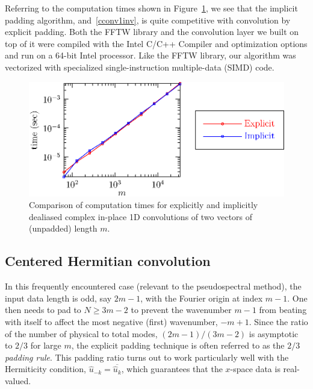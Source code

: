 \documentclass[final]{siamltex}
\begin{document}
Referring to the computation times shown in Figure~\ref{timing1c},
we see that the implicit padding algorithm,  and~\ref{cconv1inv},
is quite competitive with convolution by explicit padding. Both the FFTW library
and the convolution layer we built on top of it were compiled with the
Intel C/C++ Compiler and optimization options and run on a 64-bit Intel
processor. Like the FFTW library, our algorithm was vectorized with specialized
single-instruction multiple-data (SIMD) code.

\begin{figure}[htbp]
  \begin{center}
    \includegraphics{timing1c}
    \caption{Comparison of computation times for explicitly and implicitly
dealiased complex in-place 1D convolutions of two vectors of
(unpadded) length $m$.}
    \label{timing1c}
  \end{center}
\end{figure}

\subsection{Centered Hermitian convolution}

In this frequently encountered case (relevant to the pseudospectral
method), the input data length is odd, say $2m-1$, with the Fourier origin
at index $m-1$. One then needs to pad to $N\ge 3m-2$ to prevent the
wavenumber $m-1$ from beating with itself to affect the most negative
(first) wavenumber, $-m+1$. Since the ratio of the number of physical to
total modes, $(2m-1)/(3m-2)$ is asymptotic to $2/3$ for large $m$, the
explicit padding technique is often referred to as the {\it $2/3$ padding
rule}.  This padding ratio turns out to work particularly well with the
Hermiticity condition, $\hat{u}_{-k}=\overline{\hat{u}_k}$, which guarantees
that the $x$-space data is real-valued.
\end{document}
